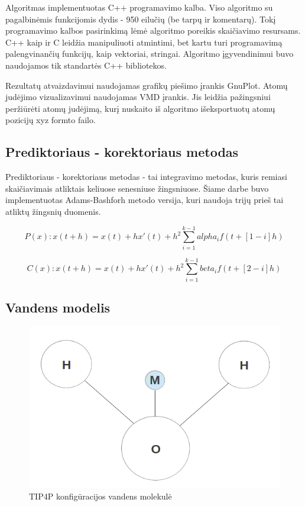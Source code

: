 Algoritmas implementuotas C++ programavimo kalba.
Viso algoritmo su pagalbinėmis funkcijomis dydis - 950 eilučių (be tarpų ir komentarų).
Tokį programavimo kalbos pasirinkimą lėmė algoritmo poreikis skaičiavimo resursams.
C++ kaip ir C leidžia manipuliuoti atmintimi, bet kartu turi programavimą palengvinančių funkcijų, kaip vektoriai, stringai.
Algoritmo įgyvendinimui buvo naudojamos tik standartės C++ bibliotekos.

Rezultatų atvaizdavimui naudojamas grafikų piešimo įrankis GnuPlot.
Atomų judėjimo vizualizavimui naudojamas VMD įrankis.
Jis leidžia pažingsniui peržiūrėti atomų judėjimą, kurį nuskaito iš algoritmo išeksportuotų atomų pozicijų xyz formto failo.


\subsection{Prediktoriaus - korektoriaus metodas}
\label{sec:predictor}

Prediktoriaus - korektoriaus metodas - tai integravimo metodas, kuris remiasi skaičiavimais atliktais keliuose senesniuse žingsniuose.
Šiame darbe buvo implementuotas Adams-Bashforh metodo versija, kuri naudoja trijų prieš tai atliktų žingsnių duomenis.

\begin{equation} \label{eq:pred}
    P(x): x(t+h) = x(t) + hx'(t) +  h^2 \sum\limits_{i=1}^{k-1} {alpha_i f(t+[1-i]h)}
\end{equation}

\begin{equation} \label{eq:corr}
    C(x): x(t+h) = x(t) + hx'(t) +  h^2 \sum\limits_{i=1}^{k-1} {beta_i f(t+[2-i]h)}
\end{equation}


\subsection{Vandens modelis}
\label{sec:water}

\begin{figure}
    \centering
    \includegraphics[scale=0.65]{images/water.png}
    \caption{TIP4P konfigūracijos vandens molekulė}
    \label{fig:water}
\end{figure}

